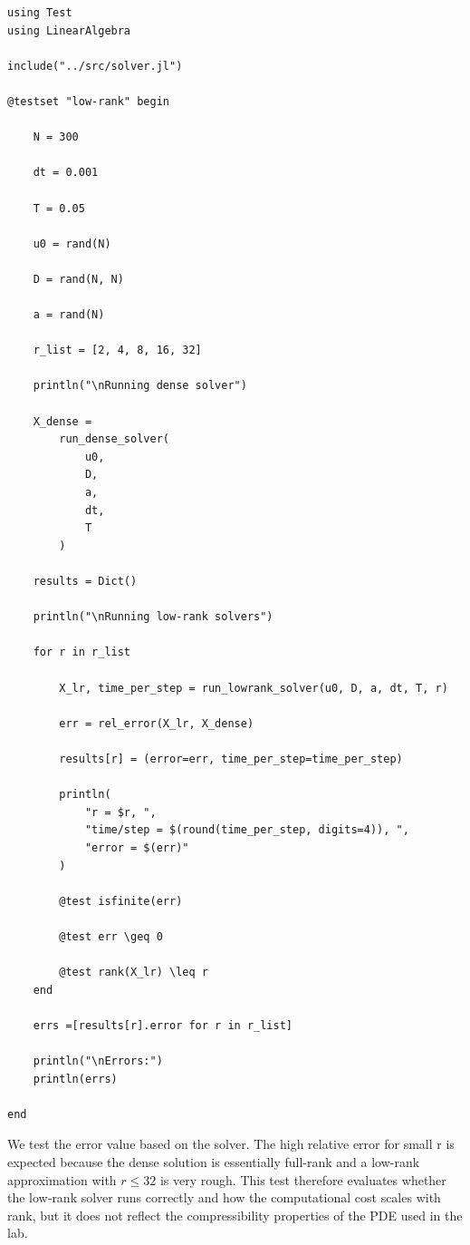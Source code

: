 \documentclass[11pt]{article}
\begin{document}
\begin{lstlisting}
using Test
using LinearAlgebra

include("../src/solver.jl")

@testset "low-rank" begin

    N = 300

    dt = 0.001

    T = 0.05

    u0 = rand(N)

    D = rand(N, N)

    a = rand(N)

    r_list = [2, 4, 8, 16, 32]

    println("\nRunning dense solver")

    X_dense =
        run_dense_solver(
            u0,
            D,
            a,
            dt,
            T
        )

    results = Dict()

    println("\nRunning low-rank solvers")

    for r in r_list

        X_lr, time_per_step = run_lowrank_solver(u0, D, a, dt, T, r)

        err = rel_error(X_lr, X_dense)

        results[r] = (error=err, time_per_step=time_per_step)

        println(
            "r = $r, ",
            "time/step = $(round(time_per_step, digits=4)), ",
            "error = $(err)"
        )

        @test isfinite(err)

        @test err \geq 0

        @test rank(X_lr) \leq r
    end

    errs =[results[r].error for r in r_list]

    println("\nErrors:")
    println(errs)

end
\end{lstlisting}

We test the error value based on the solver. The high relative error for small r is expected because the dense solution is essentially full-rank and a low-rank approximation with $r \leq 32$ is very rough.
This test therefore evaluates whether the low‑rank solver runs correctly and how the computational cost scales with rank, but it does not reflect the compressibility properties of the PDE used in the lab.

\vspace{1.5em}
\end{document}
